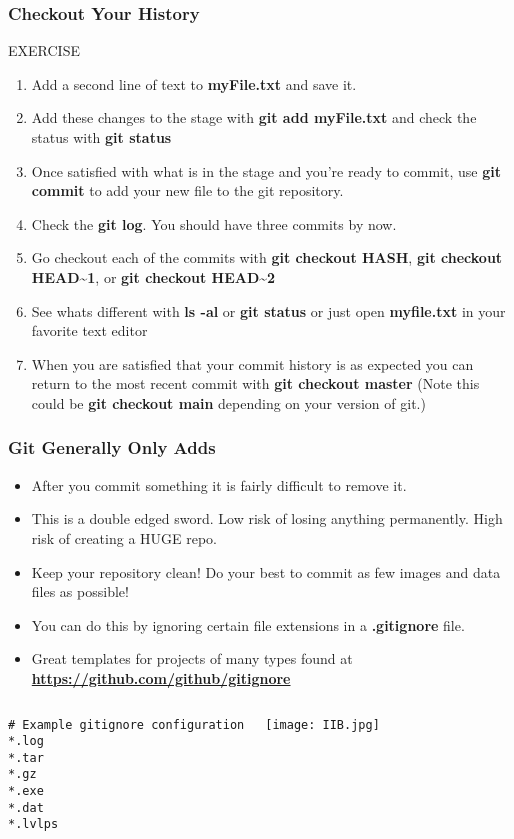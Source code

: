 \documentclass{beamer}
\begin{document}
\begin{frame}[fragile]
\frametitle{Checkout Your History}
    \begin{block}{EXERCISE}
        \begin{enumerate}
	 \item Add a second line of text to \textbf{myFile.txt} and save it.
	 \item Add these changes to the stage with \textbf{git add myFile.txt} and check the status with \textbf{git status}
        \item Once satisfied with what is in the stage and you're ready to commit, use \textbf{git commit} to add your new file to the git repository.
        \item Check the \textbf{git log}. You should have three commits by now.
	 \item Go checkout each of the commits with \textbf{git checkout \textlangle{}HASH\textrangle{}}, \textbf{git checkout HEAD\textasciitilde1}, or \textbf{git checkout HEAD\textasciitilde2}
	 \item See whats different with \textbf{ls -al} or \textbf{git status} or just open \textbf{myfile.txt} in your favorite text editor
	 \item When you are satisfied that your commit history is as expected you can return to the most recent commit with \textbf{git checkout master} (Note this could be \textbf{git checkout main} depending on your version of git.)
        \end{enumerate}
    \end{block}
\end{frame}

\begin{frame}[fragile]
\frametitle{Git Generally Only Adds}

\begin{itemize}
\item After you commit something it is fairly difficult to remove it.
\item This is a double edged sword. Low risk of losing anything permanently. High risk of creating a HUGE repo. 
\item Keep your repository clean! Do your best to commit as few images and data files as possible!
\item You can do this by ignoring certain file extensions in a \textbf{.gitignore} file.
\item Great templates for projects of many types found at \textbf{\href{https://github.com/github/}{https://github.com/github/gitignore}}
\end{itemize}
\begin{columns}
\begin{lstlisting}
# Example gitignore configuration
*.log
*.tar
*.gz
*.exe
*.dat
*.lvlps
\end{lstlisting}
\texttt{[image: IIB.jpg]}
\end{columns}
\end{frame}
\end{document}
